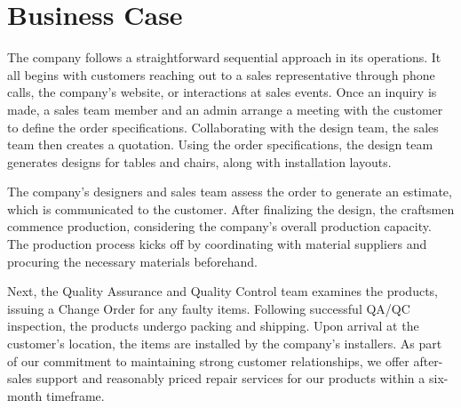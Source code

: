 \section{Business Case}
The company follows a straightforward sequential approach in its operations.
It all begins with customers reaching out to a sales representative through phone calls, the company's website, or interactions at sales events.
Once an inquiry is made, a sales team member and an admin arrange a meeting with the customer to define the order specifications. Collaborating with the design team, the sales team then creates a quotation. Using the order specifications, the design team generates designs for tables and chairs, along with installation layouts.

The company's designers and sales team assess the order to generate an estimate, which is communicated to the customer. After finalizing the design, the craftsmen commence production, considering the company's overall production capacity. The production process kicks off by coordinating with material suppliers and procuring the necessary materials beforehand.

Next, the Quality Assurance and Quality Control team examines the products, issuing a Change Order for any faulty items. Following successful QA/QC inspection, the products undergo packing and shipping. Upon arrival at the customer's location, the items are installed by the company's installers. As part of our commitment to maintaining strong customer relationships, we offer after-sales support and reasonably priced repair services for our products within a six-month timeframe.
